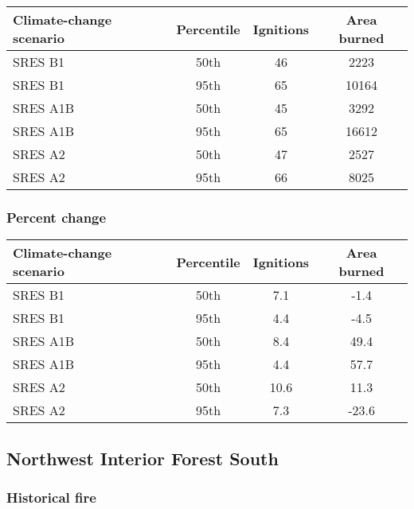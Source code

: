 \documentclass{article}\usepackage[]{graphicx}\usepackage[]{color}
\newcommand{\headcol}{\rowcolor{tableheadcolor}}
\begin{document}
\begin{table}[ht]
\centering
\begin{tabular}{lccc}
  \headcol 
 \toprule
Climate-change scenario & Percentile & Ignitions & Area burned \\ 
  \midrule
SRES B1 & 50th & 46 & 2223 \\ 
  SRES B1 & 95th & 65 & 10164 \\ 
  SRES A1B & 50th & 45 & 3292 \\ 
  SRES A1B & 95th & 65 & 16612 \\ 
  SRES A2 & 50th & 47 & 2527 \\ 
  SRES A2 & 95th & 66 & 8025 \\ 
   \bottomrule
\end{tabular}
\end{table}


\subsubsection{Percent change}

\begin{table}[ht]
\centering
\begin{tabular}{lccc}
  \headcol 
 \toprule
Climate-change scenario & Percentile & Ignitions & Area burned \\ 
  \midrule
SRES B1 & 50th & 7.1 & -1.4 \\ 
  SRES B1 & 95th & 4.4 & -4.5 \\ 
  SRES A1B & 50th & 8.4 & 49.4 \\ 
  SRES A1B & 95th & 4.4 & 57.7 \\ 
  SRES A2 & 50th & 10.6 & 11.3 \\ 
  SRES A2 & 95th & 7.3 & -23.6 \\ 
   \bottomrule
\end{tabular}
\end{table}


\newpage
\subsection{Northwest Interior Forest South}
\subsubsection{Historical fire}
\end{document}
